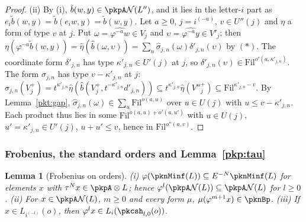 \documentclass[10pt]{amsart}
\newtheorem{lemma}[theorem]{Lemma}
\theoremstyle{definition}
\theoremstyle{remark}
\begin{document}
\begin{proof}
(ii) By (i), $\tilde b(w,y)\in\pkpA\mathcal N(L'')$, and it lies in the letter-$i$ part as
$e_i\tilde b(w,y)=\tilde b(e_iw,y)=\tilde b(w,y)$. Let $a\ge0$, $j=i^{(-a)}$, $v\in U''(j)$ and $\eta$ a form
of type $v$ at $j$. Put $\omega=\widehat{\varphi^{-a}w}\in V_j$ and $\upsilon=\widehat{\varphi^{-a}y}\in V'_j$;
then $\eta(\varphi^{-a}\tilde b(w,y))=\hat\eta(\hat b(\omega,\upsilon))=\sum_n\hat\sigma_{j,n}(\omega)
\delta'_{j,n}(\upsilon)$ by $(*)$. The coordinate form $\delta'_{j,n}$ has type $\kappa'_{j,n}\in U'(j)$ at
$j$, so $\delta'_{j,n}(\upsilon)\in\mathrm{Fil}^{o'(a,\kappa'_{j,n})}$. The form $\sigma_{j,n}$ has type
$v-\kappa'_{j,n}$ at $j$: $\hat\sigma_{j,n}(V_j^+)=t^{\kappa'_{j,n}}\hat\eta(\hat b(V_j^+,t^{-\kappa'_{j,n}}
d'_{j,n}))\subseteq t^{\kappa'_{j,n}}\hat\eta(V''^+_j)\subseteq\mathrm{Fil}^{\kappa'_{j,n}-v}$. By
Lemma~\ref{pkt:gap}, $\hat\sigma_{j,n}(\omega)\in\sum_u\mathrm{Fil}^{o(a,u)}$ over $u\in U(j)$ with $u\le
v-\kappa'_{j,n}$. Each product thus lies in some $\mathrm{Fil}^{o(a,u)+o'(a,u')}$ with $u\in U(j)$,
$u'=\kappa'_{j,n}\in U'(j)$, $u+u'\le v$, hence in $\mathrm{Fil}^{o''(a,v)}$.
\end{proof}

\subsubsection{Frobenius, the standard orders and Lemma~\ref{pkp:tau}}\label{pkt:ss-tau}

\begin{lemma}[Frobenius on orders]\label{pkt:frob}
(i) $\varphi(\pknMinf(L))\subseteq E^{-N}\pknMinf(L)$ for elements $x$ with $\tau^Nx\in\pkpA\otimes L$; hence
$\varphi^l(\pkpA\mathcal N(L))\subseteq\pkpA\mathcal N(L)$ for $l\ge0$. (ii) For $x\in\pkpA\mathcal N(L)$, $m\ge0$
and every form $\mu$, $\mu(\varphi^{m+1}x)\in\pknBp$. (iii) If $x\in L_{i^{(-l)}}(o)$, then $\varphi^lx\in
L_i(\pkcsh_{l,0}(o))$.
\end{lemma}
\end{document}
